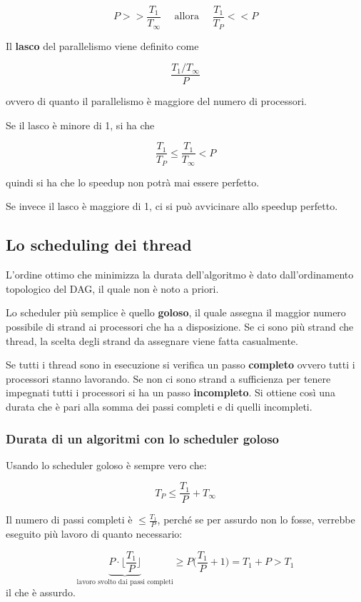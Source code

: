$$P >> \frac{T_1}{T_\infty} \quad \text{ allora } \quad \frac{T_1}{T_P} << P$$

Il \textbf{lasco} del parallelismo viene definito come

$$\frac{T_1/T_\infty}{P}$$

ovvero di quanto il parallelismo è maggiore del numero di processori.

Se il lasco è minore di 1, si ha che 

$$\frac{T_1}{T_P} \leq \frac{T_1}{T_\infty} < P$$

quindi si ha che lo speedup non potrà mai essere perfetto. 

Se invece il lasco è maggiore di 1, ci si può avvicinare allo speedup perfetto.

\subsection{Lo scheduling dei thread}\label{lo-scheduling-dei-thread}

L'ordine ottimo che minimizza la durata dell'algoritmo è dato dall'ordinamento topologico del DAG, il quale non è noto a priori.

Lo scheduler più semplice è quello \textbf{goloso}, il quale assegna il maggior numero possibile di strand ai processori che ha a disposizione. Se ci sono più strand che thread, la scelta degli strand da assegnare viene fatta casualmente.

Se tutti i thread sono in esecuzione si verifica un passo \textbf{completo} ovvero tutti i processori stanno lavorando. 
Se non ci sono strand a sufficienza per tenere impegnati tutti i processori si ha un passo \textbf{incompleto}. 
Si ottiene così una durata che è pari alla somma dei passi completi e di quelli incompleti.

\subsubsection{Durata di un algoritmi con lo scheduler goloso}

Usando lo scheduler goloso è sempre vero che:

$$T_P \leq \frac{T_1}{P} + T_\infty$$

Il numero di passi completi è $\leq \frac{T_1}{P}$, perché se per assurdo non lo fosse, verrebbe eseguito più lavoro di quanto necessario:

$$
\underbrace{P \cdot \bigg\lfloor \frac{T_1}{P}\bigg\rfloor}_{\text{lavoro svolto dai passi completi}} \geq P \bigg( \frac{T_1}{P} +1 \bigg) = T_1 + P > T_1
$$
 il che è assurdo.

